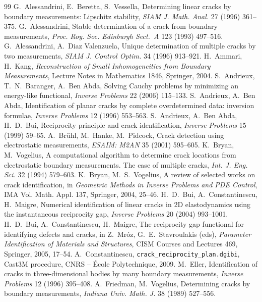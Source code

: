 \begin{chapterbib}{99}
 G.~Alessandrini, E.~Beretta, S.~Vessella, Determining linear cracks by boundary measurements: Lipschitz stability, \emph{SIAM J. Math. Anal.} 27 (1996) 361--375.
 G.~Alessandrini, Stable determination of a crack from boundary measurements, \emph{Proc. Roy. Soc. Edinburgh Sect.~A} 123 (1993) 497--516.
 G.~Alessandrini, A.~Diaz Valenzuela, Unique determination of multiple cracks by two measurements, \emph{SIAM J. Control Optim.} 34 (1996) 913--921.
 H.~Ammari, H.~Kang, \emph{Reconstruction of Small Inhomogeneities from Boundary Measurements}, Lecture Notes in Mathematics 1846, Springer, 2004.
 S.~Andrieux, T.~N.~Baranger, A.~Ben Abda, Solving Cauchy problems by minimizing an energy-like functional, \emph{Inverse Problems} 22 (2006) 115--133.
 S.~Andrieux, A.~Ben Abda, Identification of planar cracks by complete overdetermined data: inversion formulae, \emph{Inverse Problems} 12 (1996) 553--563.
 S.~Andrieux, A.~Ben Abda, H.~D.~Bui, Reciprocity principle and crack identification, \emph{Inverse Problems} 15 (1999) 59--65.
 A.~Br\"uhl, M.~Hanke, M.~Pidcock, Crack detection using electrostatic measurements, \emph{ESAIM: M2AN} 35 (2001) 595--605.
 K.~Bryan, M.~Vogelius, A computational algorithm to determine crack locations from electrostatic boundary measurements. The case of multiple cracks, \emph{Int. J. Eng. Sci.} 32 (1994) 579--603.
 K.~Bryan, M.~S.~Vogelius, A review of selected works on crack identification, in \emph{Geometric Methods in Inverse Problems and PDE Control}, IMA Vol. Math. Appl. 137, Springer, 2004, 25--46.
 H.~D.~Bui, A.~Constantinescu, H.~Maigre, Numerical identification of linear cracks in 2D elastodynamics using the instantaneous reciprocity gap, \emph{Inverse Problems} 20 (2004) 993--1001.
 H.~D.~Bui, A.~Constantinescu, H.~Maigre, The reciprocity gap functional for identifying defects and cracks, in Z.~Mr\'oz, G.~E.~Stavroulakis (eds), \emph{Parameter Identification of Materials and Structures}, CISM Courses and Lectures 469, Springer, 2005, 17--54.
 A.~Constantinescu, \texttt{crack\_reciprocity\_plan.dgibi}, Cast3M procedure, CNRS -- \'Ecole Polytechnique, 2009.
 M.~Eller, Identification of cracks in three-dimensional bodies by many boundary measurements, \emph{Inverse Problems} 12 (1996) 395--408.
 A.~Friedman, M.~Vogelius, Determining cracks by boundary measurements, \emph{Indiana Univ. Math. J.} 38 (1989) 527--556.

\end{chapterbib}
